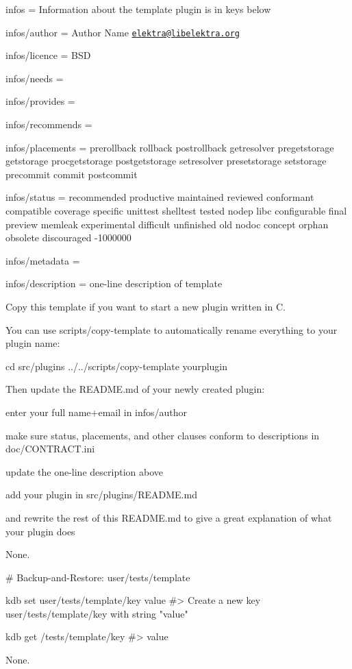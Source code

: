 
\begin{DoxyItemize}
\item infos = Information about the template plugin is in keys below
\item infos/author = Author Name \href{mailto:elektra@libelektra.org}{\tt elektra@libelektra.\+org}
\item infos/licence = B\+SD
\item infos/needs =
\item infos/provides =
\item infos/recommends =
\item infos/placements = prerollback rollback postrollback getresolver pregetstorage getstorage procgetstorage postgetstorage setresolver presetstorage setstorage precommit commit postcommit
\item infos/status = recommended productive maintained reviewed conformant compatible coverage specific unittest shelltest tested nodep libc configurable final preview memleak experimental difficult unfinished old nodoc concept orphan obsolete discouraged -\/1000000
\item infos/metadata =
\item infos/description = one-\/line description of template
\end{DoxyItemize}

Copy this template if you want to start a new plugin written in C.

You can use {\ttfamily scripts/copy-\/template} to automatically rename everything to your plugin name\+:


\begin{DoxyCode}
cd src/plugins
../../scripts/copy-template yourplugin
\end{DoxyCode}


Then update the R\+E\+A\+D\+M\+E.\+md of your newly created plugin\+:


\begin{DoxyItemize}
\item enter your full name+email in {\ttfamily infos/author}
\item make sure {\ttfamily status}, {\ttfamily placements}, and other clauses conform to descriptions in {\ttfamily doc/\+C\+O\+N\+T\+R\+A\+C\+T.\+ini}
\item update the one-\/line description above
\item add your plugin in {\ttfamily src/plugins/\+R\+E\+A\+D\+M\+E.\+md}
\item and rewrite the rest of this {\ttfamily R\+E\+A\+D\+M\+E.\+md} to give a great explanation of what your plugin does
\end{DoxyItemize}

None.


\begin{DoxyCode}
# Backup-and-Restore: user/tests/template

kdb set user/tests/template/key value
#> Create a new key user/tests/template/key with string "value"

kdb get /tests/template/key
#> value
\end{DoxyCode}


None. 